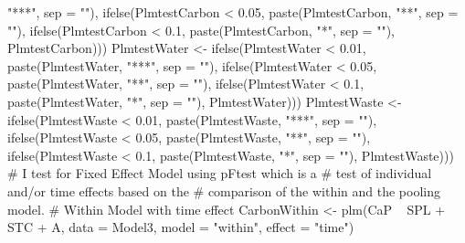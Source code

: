 \documentclass[12pt,]{article}
\newenvironment{Shaded}{}{}
\newcommand{\KeywordTok}[1]{\textcolor[rgb]{0.00,0.00,1.00}{#1}}
\newcommand{\DataTypeTok}[1]{#1}
\newcommand{\FloatTok}[1]{#1}
\newcommand{\StringTok}[1]{\textcolor[rgb]{0.00,0.50,0.50}{#1}}
\newcommand{\CommentTok}[1]{\textcolor[rgb]{0.00,0.50,0.00}{#1}}
\newcommand{\OperatorTok}[1]{#1}
\newcommand{\NormalTok}[1]{#1}
\begin{document}
\begin{Shaded}
\begin{Highlighting}[]
{    \StringTok{"***"}\NormalTok{, }\DataTypeTok{sep =} \StringTok{""}\NormalTok{), }\KeywordTok{ifelse}\NormalTok{(PlmtestCarbon }\OperatorTok{<}\StringTok{ }\FloatTok{0.05}\NormalTok{, }\KeywordTok{paste}\NormalTok{(PlmtestCarbon, }
    \StringTok{"**"}\NormalTok{, }\DataTypeTok{sep =} \StringTok{""}\NormalTok{), }\KeywordTok{ifelse}\NormalTok{(PlmtestCarbon }\OperatorTok{<}\StringTok{ }\FloatTok{0.1}\NormalTok{, }\KeywordTok{paste}\NormalTok{(PlmtestCarbon, }
    \StringTok{"*"}\NormalTok{, }\DataTypeTok{sep =} \StringTok{""}\NormalTok{), PlmtestCarbon)))}
\NormalTok{PlmtestWater <-}\StringTok{ }\KeywordTok{ifelse}\NormalTok{(PlmtestWater }\OperatorTok{<}\StringTok{ }\FloatTok{0.01}\NormalTok{, }\KeywordTok{paste}\NormalTok{(PlmtestWater, }
    \StringTok{"***"}\NormalTok{, }\DataTypeTok{sep =} \StringTok{""}\NormalTok{), }\KeywordTok{ifelse}\NormalTok{(PlmtestWater }\OperatorTok{<}\StringTok{ }\FloatTok{0.05}\NormalTok{, }\KeywordTok{paste}\NormalTok{(PlmtestWater, }
    \StringTok{"**"}\NormalTok{, }\DataTypeTok{sep =} \StringTok{""}\NormalTok{), }\KeywordTok{ifelse}\NormalTok{(PlmtestWater }\OperatorTok{<}\StringTok{ }\FloatTok{0.1}\NormalTok{, }\KeywordTok{paste}\NormalTok{(PlmtestWater, }
    \StringTok{"*"}\NormalTok{, }\DataTypeTok{sep =} \StringTok{""}\NormalTok{), PlmtestWater)))}
\NormalTok{PlmtestWaste <-}\StringTok{ }\KeywordTok{ifelse}\NormalTok{(PlmtestWaste }\OperatorTok{<}\StringTok{ }\FloatTok{0.01}\NormalTok{, }\KeywordTok{paste}\NormalTok{(PlmtestWaste, }
    \StringTok{"***"}\NormalTok{, }\DataTypeTok{sep =} \StringTok{""}\NormalTok{), }\KeywordTok{ifelse}\NormalTok{(PlmtestWaste }\OperatorTok{<}\StringTok{ }\FloatTok{0.05}\NormalTok{, }\KeywordTok{paste}\NormalTok{(PlmtestWaste, }
    \StringTok{"**"}\NormalTok{, }\DataTypeTok{sep =} \StringTok{""}\NormalTok{), }\KeywordTok{ifelse}\NormalTok{(PlmtestWaste }\OperatorTok{<}\StringTok{ }\FloatTok{0.1}\NormalTok{, }\KeywordTok{paste}\NormalTok{(PlmtestWaste, }
    \StringTok{"*"}\NormalTok{, }\DataTypeTok{sep =} \StringTok{""}\NormalTok{), PlmtestWaste)))}
\CommentTok{# I test for Fixed Effect Model using pFtest which is a}
\CommentTok{# test of individual and/or time effects based on the}
\CommentTok{# comparison of the within and the pooling model.}
\CommentTok{# Within Model with time effect}
\NormalTok{CarbonWithin <-}\StringTok{ }\KeywordTok{plm}\NormalTok{(CaP }\OperatorTok{~}\StringTok{ }\NormalTok{SPL }\OperatorTok{+}\StringTok{ }\NormalTok{STC }\OperatorTok{+}\StringTok{ }\NormalTok{A, }\DataTypeTok{data =}\NormalTok{ Model3, }
    \DataTypeTok{model =} \StringTok{"within"}\NormalTok{, }\DataTypeTok{effect =} \StringTok{"time"}\NormalTok{)}
}
\end{Highlighting}
\end{Shaded}
\end{document}
